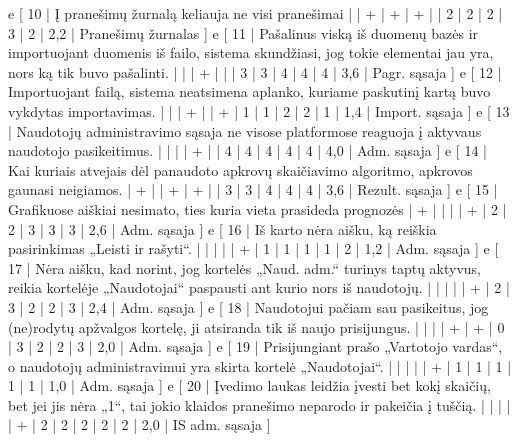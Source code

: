 {  e [ 10  | Į pranešimų žurnalą keliauja ne visi pranešimai
                    |   | + | + | + |   | 2 | 2 | 2 | 3 | 2 | 2,2  | Pranešimų žurnalas ]
  e [ 11  | Pašalinus viską iš duomenų bazės ir importuojant duomenis iš failo,
  sistema skundžiasi, jog tokie elementai jau yra, nors ką tik buvo pašalinti.
                    |   |   | + |   |   | 3 | 3 | 4 | 4 | 4 | 3,6  | Pagr. sąsaja ]
  e [ 12  | Importuojant failą, sistema neatsimena aplanko, kuriame paskutinį
  kartą buvo vykdytas importavimas.
                    |   |   | + |   | + | 1 | 1 | 2 | 2 | 1 | 1,4  | Import. sąsaja ]
  e [ 13  | Naudotojų administravimo sąsaja ne visose platformose reaguoja į
  aktyvaus naudotojo pasikeitimus.
                    |   |   |   | + |   | 4 | 4 | 4 | 4 | 4 | 4,0  | Adm. sąsaja ]
  e [ 14  | Kai kuriais atvejais dėl panaudoto apkrovų skaičiavimo algoritmo,
  apkrovos gaunasi neigiamos.
                    | + |   | + | + |   | 3 | 3 | 4 | 4 | 4 | 3,6  | Rezult. sąsaja ]
  e [ 15 | Grafikuose aiškiai nesimato, ties kuria vieta prasideda prognozės
                    | + |   |   |   | + | 2 | 2 | 3 | 3 | 3 | 2,6  | Adm. sąsaja ]
  e [ 16 | Iš karto nėra aišku, ką reiškia pasirinkimas „Leisti ir rašyti“.
                    |   |   |   |   | + | 1 | 1 | 1 | 1 | 2 | 1,2  | Adm. sąsaja ]
  e [ 17 | Nėra aišku, kad norint, jog kortelės „Naud. adm.“ turinys taptų aktyvus,
  reikia kortelėje „Naudotojai“ paspausti ant kurio nors iš naudotojų.
                    |   |   |   |   | + | 2 | 3 | 2 | 2 | 3 | 2,4  | Adm. sąsaja ]
  e [ 18 | Naudotojui pačiam sau pasikeitus, jog (ne)rodytų apžvalgos kortelę, ji
  atsiranda tik iš naujo prisijungus.
                    |   |   |   | + | + | 0 | 3 | 2 | 2 | 3 | 2,0  | Adm. sąsaja ]
  e [ 19 | Prisijungiant prašo „Vartotojo vardas“, o naudotojų administravimui
  yra skirta kortelė „Naudotojai“.
                    |   |   |   |   | + | 1 | 1 | 1 | 1 | 1 | 1,0  | Adm. sąsaja ]
  e [ 20 | Įvedimo laukas leidžia įvesti bet kokį skaičių, bet jei jis nėra
  „1“, tai jokio klaidos pranešimo neparodo ir pakeičia į tuščią.
                    |   |   |   |   | + | 2 | 2 | 2 | 2 | 2 | 2,0  | IS adm. sąsaja ]
}
